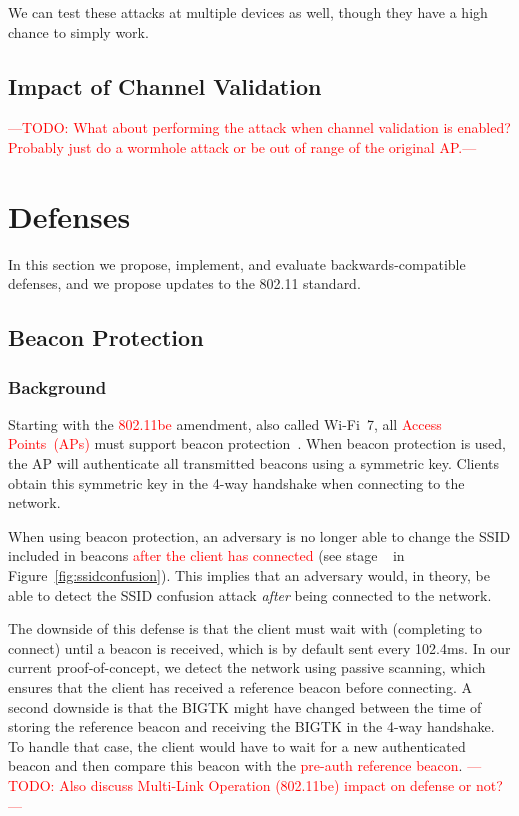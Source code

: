 \documentclass[sigconf,review,anonymous]{acmart}
\newcommand{\circlenum}[1]{\textcircled{\raisebox{-0.90pt}{#1}}}
\newcommand{\wifi}{\mbox{Wi-Fi}}
\newcommand{\fourway}{\mbox{4-way}}
\DeclareRobustCommand{\red}[1]{\textcolor{red}{#1}}
\begin{document}
We can test these attacks at multiple devices as well, though they have a high chance to simply work.


\subsection{Impact of Channel Validation}
\label{sec:ocv}

\red{---TODO: What about performing the attack when channel validation is enabled? Probably just do a wormhole attack or be out of range of the original AP.---}

\section{Defenses}
\label{sec:defenses}

In this section we propose, implement, and evaluate backwards-compatible defenses, and we propose updates to the 802.11 standard.

\subsection{Beacon Protection}

\subsubsection{Background}

Starting with the \red{802.11be} amendment, also called \wifi{}~7, all \red{Access Points~(APs)} must support beacon protection~\cite{ieee-mentor-mandate-beaconprot}.
When beacon protection is used, the AP will authenticate all transmitted beacons using a symmetric key.
Clients obtain this symmetric key in the \fourway{} handshake when connecting to the network.

When using beacon protection, an adversary is no longer able to change the SSID included in beacons \red{after the client has connected} (see stage~\circlenum{3} in Figure~\ref{fig:ssidconfusion}).
This implies that an adversary would, in theory, be able to detect the SSID confusion attack \emph{after} being connected to the network.

The downside of this defense is that the client must wait with (completing to connect) until a beacon is received, which is by default sent every 102.4ms.
In our current proof-of-concept, we detect the network using passive scanning, which ensures that the client has received a reference beacon before connecting.
A second downside is that the BIGTK might have changed between the time of storing the reference beacon and receiving the BIGTK in the 4-way handshake.
To handle that case, the client would have to wait for a new authenticated beacon and then compare this beacon with the \red{pre-auth reference beacon}.
\red{---TODO: Also discuss Multi-Link Operation (802.11be) impact on defense or not?---}
\end{document}
